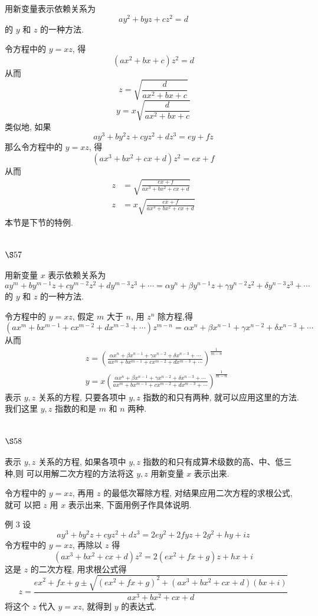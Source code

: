 用新变量表示依赖关系为
\[
a y^{2}+b y z+c z^{2}=d
\]
的 $y$ 和 $z$ 的一种方法.

令方程中的 $y=x z$, 得
\[
\left(a x^{2}+b x+c\right) z^{2}=d
\]
从而
\[
z=\sqrt{\frac{d}{a x^{2}+b x+c}}
\]
\[
y=x \sqrt{\frac{d}{a x^{2}+b x+c}}
\]
类似地, 如果
\[
a y^{3}+b y^{2} z+c y z^{2}+d z^{3}=e y+f z
\]
那么令方程中的 $y=x z$, 得
\[
\left(a x^{3}+b x^{2}+c x+d\right) z^{2}=e x+f
\]
从而
\[
\begin{aligned}
z & =\sqrt{\frac{e x+f}{a x^{3}+b x^{2}+c x+d}} \\
z & =x \sqrt{\frac{e x+f}{a x^{3}+b x^{2}+c x+d}}
\end{aligned}
\]
本节是下节的特例.

\section{$\S 57$}

用新变量 $x$ 表示依赖关系为
\[
a y^{m}+b y^{m-1} z+c y^{m-2} z^{2}+d y^{m-3} z^{3}+\cdots=\alpha y^{n}+\beta y^{n-1} z+\gamma y^{n-2} z^{2}+\delta y^{n-3} z^{3}+\cdots
\]
的 $y$ 和 $z$ 的一种方法.

令方程中的 $y=x z$, 假定 $m$ 大于 $n$, 用 $z^{n}$ 除方程,得
\[
\left(a x^{m}+b x^{m-1}+c x^{m-2}+d x^{m-3}+\cdots\right) z^{m-n}=\alpha x^{n}+\beta x^{n-1}+\gamma x^{n-2}+\delta x^{n-3}+\cdots
\]
从而
\[
\begin{aligned}
& z=\left(\frac{\alpha x^{n}+\beta x^{n-1}+\gamma x^{n-2}+\delta x^{n-3}+\cdots}{a x^{m}+b x^{m-1}+c x^{m-2}+d x^{m-3}+\cdots}\right)^{\frac{1}{m-n}} \\
& y=x\left(\frac{\alpha x^{n}+\beta x^{n-1}+\gamma x^{n-2}+\delta x^{n-3}+\cdots}{a x^{m}+b x^{m-1}+c x^{m-2}+d x^{m-3}+\cdots}\right)^{\frac{1}{m-n}}
\end{aligned}
\]
表示 $y, z$ 关系的方程, 只要各项中 $y, z$ 指数的和只有两种, 就可以应用这里的方法. 我们这里 $y, z$ 指数的和是 $m$ 和 $n$ 两种.

\section{$\S 58$}

表示 $y, z$ 关系的方程, 如果各项中 $y, z$ 指数的和只有成算术级数的高、中、低三种,则 可以用解二次方程的方法将这 $y, z$ 用新变量 $x$ 表示出来.

令方程中的 $y=x z$, 再用 $z$ 的最低次幂除方程, 对结果应用二次方程的求根公式, 就可 以把 $z$ 用 $x$ 表示出来, 下面用例子作具体说明.

例 3 设
\[
a y^{3}+b y^{2} z+c y z^{2}+d z^{3}=2 e y^{2}+2 f y z+2 g^{2}+h y+i z
\]
令方程中的 $y=x z$, 再除以 $z$ 得 
\[
\left(a x^{3}+b x^{2}+c x+d\right) z^{2}=2\left(e x^{2}+f x+g\right) z+h x+i
\]
这是 $z$ 的二次方程, 用求根公式得
\[
z=\frac{e x^{2}+f x+g \pm \sqrt{\left(e x^{2}+f x+g\right)^{2}+\left(a x^{3}+b x^{2}+c x+d\right)(b x+i)}}{a x^{3}+b x^{2}+c x+d}
\]
将这个 $z$ 代入 $y=x z$, 就得到 $y$ 的表达式.

